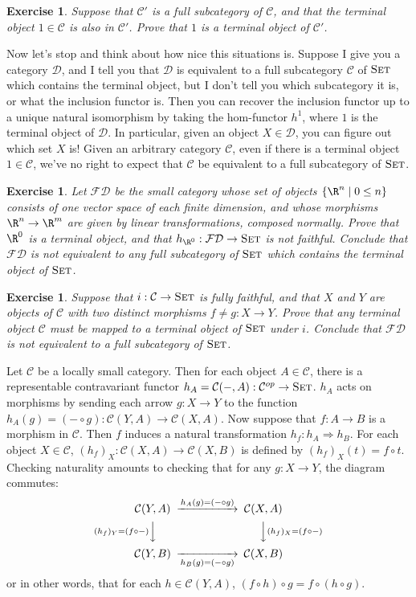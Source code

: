 \documentclass[11pt]{article}
\theoremstyle{plain}
\newtheorem{exrc}[thm]{Exercise}
\theoremstyle{definition}
\newcommand{\s}[1]{\mathcal{#1}}
\newcommand{\Set}{{\textsc{Set}}}
\begin{document}
\begin{exrc}
    Suppose that $\s{C}'$ is a full subcategory of $\s{C}$, and that the terminal object $1 \in \s{C}$ is also in $\s{C}'$. Prove that $1$ is a terminal object of $\s{C}'$.
\end{exrc}

Now let's stop and think about how nice this situations is. Suppose I give you a category $\s{D}$, and I tell you that $\s{D}$ is equivalent to a full subcategory $\s{C}$ of $\Set$ which contains the terminal object, but I don't tell you which subcategory it is, or what the inclusion functor is. Then you can recover the inclusion functor up to a unique natural isomorphism by taking the hom-functor $h^1$, where $1$ is the terminal object of $\s{D}$. In particular, given an object $X \in \s{D}$, you can figure out which set $X$ is!
Given an arbitrary category $\s{C}$, even if there is a terminal object $1 \in \s{C}$, we've no right to expect that $\s{C}$ be equivalent to a full subcategory of $\Set$.

\begin{exrc}
    Let $\s{FD}$ be the small category whose set of objects $\{\R^n \mid 0 \le n\}$ consists of one vector space of each finite dimension, and whose morphisms $\R^n \to \R^m$ are given by linear transformations, composed normally. Prove that $\R^0$ is a terminal object, and that $h_{\R^0} : \s{FD} \to \Set$ is not faithful. Conclude that $\s{FD}$ is not equivalent to any full subcategory of $\Set$ which contains the terminal object of $\Set$.
\end{exrc}

\begin{exrc}
    Suppose that $i : \s{C} \to \Set$ is fully faithful, and that $X$ and $Y$ are objects of $\s{C}$ with two distinct morphisms $f \neq g : X \to Y$. Prove that any terminal object $\s{C}$ must be mapped to a terminal object of $\Set$ under $i$. Conclude that $\s{FD}$ is not equivalent to a full subcategory of $\Set$.
\end{exrc}

Let $\s{C}$ be a locally small category. Then for each object $A \in \s{C}$, there is a representable contravariant functor $h_A = \s{C}(-,A) : \s{C}^{op} \to \Set$. $h_A$ acts on morphisms by sending each arrow $g : X \to Y$ to the function $h_A(g) = (- \circ g) : \s{C}(Y,A) \to \s{C}(X,A)$. Now suppose that $f : A \to B$ is a morphism in $\s{C}$. Then $f$ induces a natural transformation $h_f : h_A \Rightarrow h_B$. For each object $X \in \s{C}$, $(h_f)_X : \s{C}(X,A) \to \s{C}(X,B)$ is defined by $(h_f)_X(t) = f \circ t$. Checking naturality amounts to checking that for any $g : X \to Y$, the diagram commutes:
\[
    \begin{CD}
        \s{C}(Y,A) @>h_A(g) = (-\circ g)>> \s{C}(X,A) \\
        @V(h_f)_Y=(f\circ-)VV @VV(h_f)_X = (f\circ-)V \\
        \s{C}(Y,B) @>>h_B(g) = (-\circ g)> \s{C}(X,B)
    \end{CD}
\]
or in other words, that for each $h \in \s{C}(Y,A)$, $(f \circ h) \circ g = f \circ (h \circ g)$.
\end{document}
